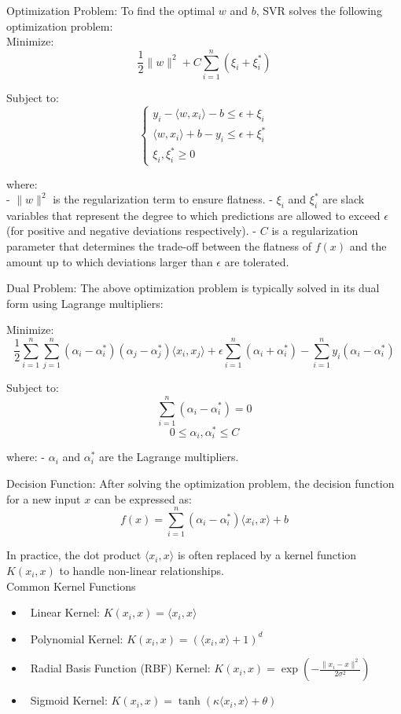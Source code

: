 \documentclass{ieeeojies}
\begin{document}
Optimization Problem: To find the optimal \( w \) and \( b \), SVR solves the following optimization problem: \\

Minimize:
\[\frac{1}{2} \| w \|^2 + C \sum_{i=1}^n (\xi_i + \xi_i^*)\]

Subject to:
\[\begin{cases} y_i - \langle w, x_i \rangle - b \leq \epsilon + \xi_i \\
\langle w, x_i \rangle + b - y_i \leq \epsilon + \xi_i^* \\
\xi_i, \xi_i^* \geq 0 
\end{cases} \]

where: \\
- \( \| w \|^2 \) is the regularization term to ensure flatness.
- \( \xi_i \) and \( \xi_i^* \) are slack variables that represent the degree to which predictions are allowed to exceed \(\epsilon\) (for positive and negative deviations respectively).
- \( C \) is a regularization parameter that determines the trade-off between the flatness of \( f(x) \) and the amount up to which deviations larger than \(\epsilon\) are tolerated.

Dual Problem: The above optimization problem is typically solved in its dual form using Lagrange multipliers:

Minimize:
\[
\frac{1}{2} \sum_{i=1}^n \sum_{j=1}^n (\alpha_i - \alpha_i^*)(\alpha_j - \alpha_j^*) \langle x_i, x_j \rangle + \epsilon \sum_{i=1}^n (\alpha_i + \alpha_i^*) - \sum_{i=1}^n y_i (\alpha_i - \alpha_i^*)
\]

Subject to:
\[\sum_{i=1}^n (\alpha_i - \alpha_i^*) = 0\]
\[0 \leq \alpha_i, \alpha_i^* \leq C\]

where:
- \( \alpha_i \) and \( \alpha_i^* \) are the Lagrange multipliers.

Decision Function: After solving the optimization problem, the decision function for a new input \( x \) can be expressed as: \\
\[f(x) = \sum_{i=1}^n (\alpha_i - \alpha_i^*) \langle x_i, x \rangle + b\]

In practice, the dot product \( \langle x_i, x \rangle \) is often replaced by a kernel function \( K(x_i, x) \) to handle non-linear relationships. \\
Common Kernel Functions
\begin{itemize}
    \item \ Linear Kernel: \( K(x_i, x) = \langle x_i, x \rangle \)
    \item \ Polynomial Kernel: \( K(x_i, x) = (\langle x_i, x \rangle + 1)^d \)
    \item \ Radial Basis Function (RBF) Kernel: \( K(x_i, x) = \exp\left(-\frac{\| x_i - x \|^2}{2\sigma^2}\right) \)
    \item \ Sigmoid Kernel: \( K(x_i, x) = \tanh(\kappa \langle x_i, x \rangle + \theta) \)
\end{itemize}
\end{document}
